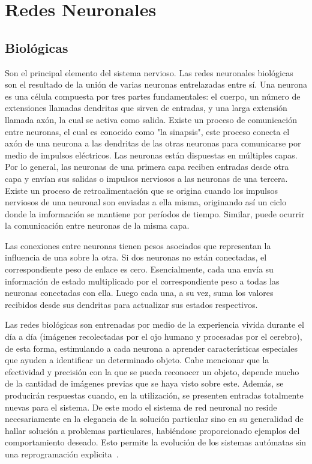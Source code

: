 \section{Redes Neuronales}
\subsection{Biológicas}

Son el principal elemento del sistema nervioso. Las redes neuronales biológicas son el resultado de la unión de varias neuronas entrelazadas entre sí. Una neurona es una célula compuesta por tres partes fundamentales: el cuerpo, un número de extensiones llamadas dendritas que sirven de entradas, y una larga extensión llamada axón, la cual se activa como salida. Existe un proceso de comunicación entre neuronas, el cual es conocido como "la sinapsis", este proceso conecta el axón de una neurona a las dendritas de las otras neuronas para comunicarse por medio de impulsos eléctricos. Las neuronas están dispuestas en múltiples capas. Por lo general, las neuronas de una primera capa reciben entradas desde otra capa y envían sus salidas o impulsos nerviosos a las neuronas de una tercera. Existe un proceso de retroalimentación que se origina cuando los impulsos nerviosos de una neuronal son enviadas a ella misma, originando así un ciclo donde la imformación se mantiene por períodos de tiempo. Similar, puede ocurrir la comunicación entre neuronas de la misma capa.

Las conexiones entre neuronas tienen pesos asociados que representan la influencia de una sobre la otra. Si dos neuronas no están conectadas, el correspondiente peso de enlace es cero. Esencialmente, cada una envía su información de estado multiplicado por el correspondiente peso a todas las neuronas conectadas con ella. Luego
cada una, a su vez, suma los valores recibidos desde sus dendritas para actualizar sus estados respectivos.

Las redes biológicas son entrenadas por medio de la experiencia vivida durante el día a día (imágenes recolectadas por el ojo humano y procesadas por el cerebro), de esta forma, estimulando a cada neurona a aprender características especiales que ayuden a identificar un determinado objeto. Cabe mencionar que la efectividad y precisión con la que se pueda reconocer un objeto, depende mucho de la cantidad de imágenes previas que se haya visto sobre este. Además, se producirán respuestas cuando, en la utilización, se presenten entradas totalmente nuevas para el sistema. De este modo el sistema de red neuronal no reside necesariamente en la elegancia de la solución particular sino en su generalidad de hallar solución a problemas particulares, habiéndose proporcionado ejemplos del comportamiento deseado. Esto permite la evolución de los sistemas autómatas sin una reprogramación explicita~\cite{21RedesNeuronales}.

